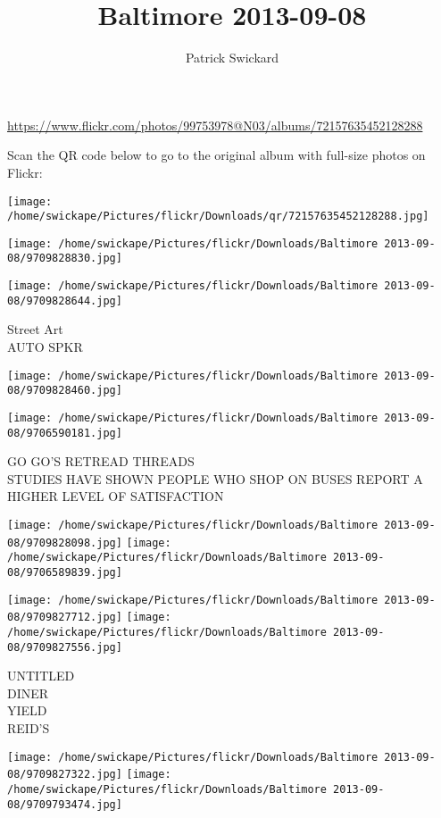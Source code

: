 \documentclass[10pt,letterpaper]{article}
\title{Baltimore 2013-09-08}
\author{Patrick Swickard}
\date{}
\begin{document}
\maketitle

\url{https://www.flickr.com/photos/99753978@N03/albums/72157635452128288}

Scan the QR code below to go to the original album with full-size photos on Flickr:

\texttt{[image: /home/swickape/Pictures/flickr/Downloads/qr/72157635452128288.jpg]}
\pagebreak

\texttt{[image: /home/swickape/Pictures/flickr/Downloads/Baltimore 2013-09-08/9709828830.jpg]}

\vspace{0.25in}
\texttt{[image: /home/swickape/Pictures/flickr/Downloads/Baltimore 2013-09-08/9709828644.jpg]}

Street Art\\
AUTO SPKR
\pagebreak

\texttt{[image: /home/swickape/Pictures/flickr/Downloads/Baltimore 2013-09-08/9709828460.jpg]}

\vspace{0.25in}
\texttt{[image: /home/swickape/Pictures/flickr/Downloads/Baltimore 2013-09-08/9706590181.jpg]}

GO GO'S RETREAD THREADS\\
STUDIES HAVE SHOWN PEOPLE WHO SHOP ON BUSES REPORT A HIGHER LEVEL OF SATISFACTION
\pagebreak

\texttt{[image: /home/swickape/Pictures/flickr/Downloads/Baltimore 2013-09-08/9709828098.jpg]}
\texttt{[image: /home/swickape/Pictures/flickr/Downloads/Baltimore 2013-09-08/9706589839.jpg]}

\texttt{[image: /home/swickape/Pictures/flickr/Downloads/Baltimore 2013-09-08/9709827712.jpg]}
\texttt{[image: /home/swickape/Pictures/flickr/Downloads/Baltimore 2013-09-08/9709827556.jpg]}

UNTITLED\\
DINER\\
YIELD\\
REID'S
\pagebreak

\texttt{[image: /home/swickape/Pictures/flickr/Downloads/Baltimore 2013-09-08/9709827322.jpg]}
\texttt{[image: /home/swickape/Pictures/flickr/Downloads/Baltimore 2013-09-08/9709793474.jpg]}
\end{document}
